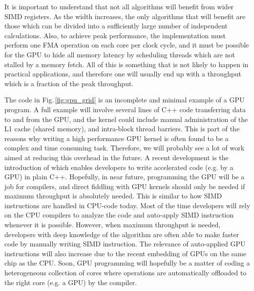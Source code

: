 It is important to understand that not all algorithms will benefit from wider SIMD registers. As the width increases, the only algorithms that will benefit are those which can be divided into a sufficiently large number of independent calculations. Also, to achieve peak performance, the implementation must perform one FMA operation on each core per clock cycle, and it must be possible for the GPU to hide all memory latency by scheduling threads which are not stalled by a memory fetch. All of this is something that is not likely to happen in practical applications, and therefore one will usually end up with a throughput which is a fraction of the peak throughput.

The code in Fig.\,\ref{fig:gpu_grid} is an incomplete and minimal example of a GPU program. A full example will involve several lines of C++ code transferring data to and from the GPU, and the kernel could include manual administration of the L1 cache (shared memory), and intra-block thread barriers. This is part of the reasons why writing a high performance GPU kernel is often found to be a complex and time consuming task. Therefore, we will probably see a lot of work aimed at reducing this overhead in the future.  A recent development is the introduction of  which enables developers to write accelerated code (e.g. by a GPU) in plain C++. Hopefully, in near future, programming the GPU will be a job for compilers, and direct fiddling with GPU kernels should only be needed if maximum throughput is absolutely needed. This is similar to how SIMD instructions are handled in CPU-code today. Most of the time developers will rely on the CPU compilers to analyze the code and auto-apply SIMD instruction whenever it is possible. However, when maximum throughput is needed, developers with deep knowledge of the algorithm are often able to make faster code by manually writing SIMD instruction. The relevance of auto-applied GPU instructions will also increase due to the recent embedding of GPUs on the same chip as the CPU. Soon, GPU programming will hopefully be a matter of coding a heterogeneous collection of cores where operations are automatically offloaded to the right core (e.g. a GPU) by the compiler.

